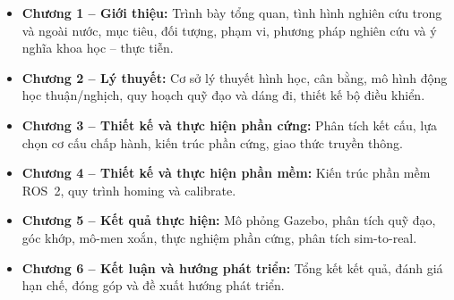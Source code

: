 \begin{itemize}
    \item \textbf{Chương 1 -- Giới thiệu:} Trình bày tổng quan, tình hình nghiên cứu trong và ngoài nước, mục tiêu, đối tượng, phạm vi, phương pháp nghiên cứu và ý nghĩa khoa học -- thực tiễn.
    \item \textbf{Chương 2 -- Lý thuyết:} Cơ sở lý thuyết hình học, cân bằng, mô hình động học thuận/nghịch, quy hoạch quỹ đạo và dáng đi, thiết kế bộ điều khiển.
    \item \textbf{Chương 3 -- Thiết kế và thực hiện phần cứng:} Phân tích kết cấu, lựa chọn cơ cấu chấp hành, kiến trúc phần cứng, giao thức truyền thông.
    \item \textbf{Chương 4 -- Thiết kế và thực hiện phần mềm:} Kiến trúc phần mềm ROS~2, quy trình homing và calibrate.
    \item \textbf{Chương 5 -- Kết quả thực hiện:} Mô phỏng Gazebo, phân tích quỹ đạo, góc khớp, mô-men xoắn, thực nghiệm phần cứng, phân tích sim-to-real.
    \item \textbf{Chương 6 -- Kết luận và hướng phát triển:} Tổng kết kết quả, đánh giá hạn chế, đóng góp và đề xuất hướng phát triển.
\end{itemize}
